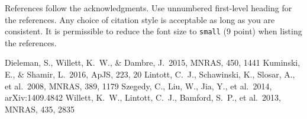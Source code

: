 \documentclass{article}
\begin{document}
References follow the acknowledgments. Use unnumbered first-level
heading for the references. Any choice of citation style is acceptable
as long as you are consistent. It is permissible to reduce the font
size to \verb+small+ (9 point) when listing the references.

\begin{thebibliography}{9}
 Dieleman, S., Willett, K.~W., \& Dambre, J.\ 2015, MNRAS, 450, 1441 
 Kuminski, E., \& Shamir, L.\ 2016, ApJS, 223, 20 
 Lintott, C.~J., Schawinski, K., Slosar, A., et al.\ 2008, MNRAS, 389, 1179
 Szegedy, C., Liu, W., Jia, Y., et al.\ 2014, arXiv:1409.4842 
 Willett, K.~W., Lintott, C.~J., Bamford, S.~P., et al.\ 2013, MNRAS, 435, 2835  
\end{thebibliography}
\end{document}
